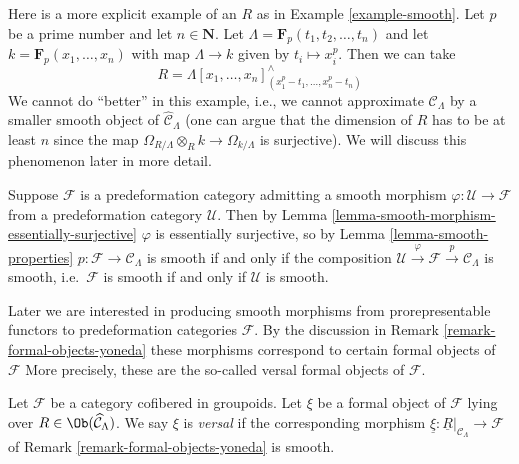 \begin{example}
\label{example-smooth-explicit}
Here is a more explicit example of an $R$ as in
Example \ref{example-smooth}.
Let $p$ be a prime number and let $n \in \mathbf{N}$.
Let $\Lambda = \mathbf{F}_p(t_1, t_2, \ldots, t_n)$ and let
$k = \mathbf{F}_p(x_1, \ldots, x_n)$ with map $\Lambda \to k$ given
by $t_i \mapsto x_i^p$. Then we can take
$$
R = \Lambda[x_1, \ldots, x_n]^\wedge_{(x_1^p - t_1, \ldots, x_n^p - t_n)}
$$
We cannot do ``better'' in this example, i.e., we cannot approximate
$\mathcal{C}_\Lambda$ by a smaller smooth object of
$\widehat{\mathcal{C}}_\Lambda$ (one can argue that the dimension of $R$
has to be at least $n$ since the map
$\Omega_{R/\Lambda} \otimes_R k \to \Omega_{k/\Lambda}$ is
surjective). We will discuss this phenomenon later in more detail.
\end{example}

\begin{remark}
\label{remark-smooth-on-top}
Suppose $\mathcal{F}$ is a predeformation category admitting a smooth morphism
$\varphi : \mathcal U \to \mathcal{F}$ from a predeformation category
$\mathcal{U}$.  Then by
Lemma \ref{lemma-smooth-morphism-essentially-surjective}
$\varphi$ is essentially surjective, so by
Lemma \ref{lemma-smooth-properties}
$p: \mathcal{F} \to \mathcal{C}_\Lambda$ is smooth if and only if the
composition $\mathcal U \xrightarrow{\varphi} \mathcal{F} \xrightarrow{p}
\mathcal{C}_\Lambda$ is smooth, i.e.\ $\mathcal{F}$ is smooth if and only if
$\mathcal{U}$ is smooth.
\end{remark}

\noindent
Later we are interested in producing smooth morphisms from
prorepresentable functors to predeformation categories $\mathcal{F}$.
By the discussion in
Remark \ref{remark-formal-objects-yoneda}
these morphisms correspond to certain formal objects of $\mathcal{F}$
More precisely, these are the so-called versal formal objects of $\mathcal{F}$.

\begin{definition}
\label{definition-versal}
Let $\mathcal{F}$ be a category cofibered in groupoids.  Let $\xi$ be a formal
object of $\mathcal{F}$ lying over $R \in \Ob(\widehat{\mathcal
C}_\Lambda)$.  We say $\xi$ is {\it versal} if the corresponding morphism
$\underline{\xi}: \underline{R}|_{\mathcal{C}_\Lambda} \to \mathcal{F}$
of Remark \ref{remark-formal-objects-yoneda} is smooth.
\end{definition}

